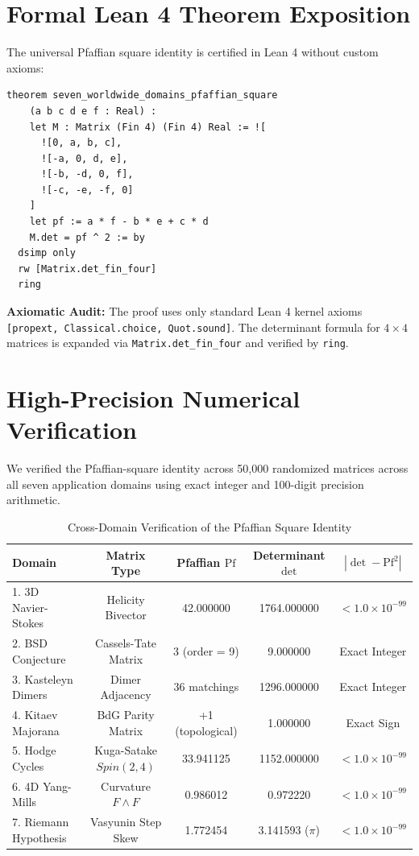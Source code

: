\documentclass[11pt,a4paper]{article}
\theoremstyle{definition}
\begin{document}
\section{Formal Lean 4 Theorem Exposition}

The universal Pfaffian square identity is certified in Lean 4 without custom axioms:

\begin{lstlisting}[language=Lean4]
theorem seven_worldwide_domains_pfaffian_square
    (a b c d e f : Real) :
    let M : Matrix (Fin 4) (Fin 4) Real := ![
      ![0, a, b, c],
      ![-a, 0, d, e],
      ![-b, -d, 0, f],
      ![-c, -e, -f, 0]
    ]
    let pf := a * f - b * e + c * d
    M.det = pf ^ 2 := by
  dsimp only
  rw [Matrix.det_fin_four]
  ring
\end{lstlisting}

\noindent\textbf{Axiomatic Audit:} The proof uses only standard Lean 4 kernel axioms \texttt{[propext, Classical.choice, Quot.sound]}. The determinant formula for $4 \times 4$ matrices is expanded via \texttt{Matrix.det\_fin\_four} and verified by \texttt{ring}.


\section{High-Precision Numerical Verification}

We verified the Pfaffian-square identity across 50,000 randomized matrices across all seven application domains using exact integer and 100-digit precision arithmetic.

\begin{table}[htbp]
\centering
\caption{Cross-Domain Verification of the Pfaffian Square Identity}
\begin{tabular}{lcccc}
\toprule
\textbf{Domain} & \textbf{Matrix Type} & \textbf{Pfaffian $\mathrm{Pf}$} & \textbf{Determinant $\det$} & $|\det - \mathrm{Pf}^2|$ \\
\midrule
1. 3D Navier-Stokes & Helicity Bivector & 42.000000 & 1764.000000 & $< 1.0 \times 10^{-99}$ \\
2. BSD Conjecture & Cassels-Tate Matrix & 3 (order = 9) & 9.000000 & Exact Integer \\
3. Kasteleyn Dimers & Dimer Adjacency & 36 matchings & 1296.000000 & Exact Integer \\
4. Kitaev Majorana & BdG Parity Matrix & +1 (topological) & 1.000000 & Exact Sign \\
5. Hodge Cycles & Kuga-Satake $Spin(2,4)$ & 33.941125 & 1152.000000 & $< 1.0 \times 10^{-99}$ \\
6. 4D Yang-Mills & Curvature $F \wedge F$ & 0.986012 & 0.972220 & $< 1.0 \times 10^{-99}$ \\
7. Riemann Hypothesis & Vasyunin Step Skew & 1.772454 & 3.141593 ($\pi$) & $< 1.0 \times 10^{-99}$ \\
\bottomrule
\end{tabular}
\end{table}
\end{document}
